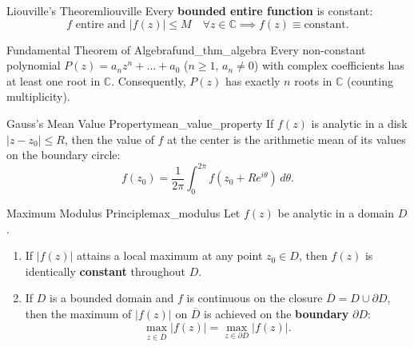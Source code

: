 \begin{theorem}{Liouville's Theorem}{liouville}
Every \textbf{bounded entire function} is constant:
\begin{equation}
f \text{ entire and } |f(z)| \le M \quad \forall z \in \mathbb{C} \implies f(z) \equiv \text{constant}.
\end{equation}
\end{theorem}

\begin{theorem}{Fundamental Theorem of Algebra}{fund_thm_algebra}
Every non-constant polynomial $P(z) = a_n z^n + \dots + a_0$ ($n \ge 1$, $a_n \neq 0$) with complex coefficients has at least one root in $\mathbb{C}$.
Consequently, $P(z)$ has exactly $n$ roots in $\mathbb{C}$ (counting multiplicity).
\end{theorem}

\begin{theorem}{Gauss's Mean Value Property}{mean_value_property}
If $f(z)$ is analytic in a disk $|z - z_0| \le R$, then the value of $f$ at the center is the arithmetic mean of its values on the boundary circle:
\begin{equation}
f(z_0) = \frac{1}{2\pi} \int_0^{2\pi} f(z_0 + R e^{i\theta})\, d\theta.
\end{equation}
\end{theorem}

\begin{theorem}{Maximum Modulus Principle}{max_modulus}
Let $f(z)$ be analytic in a domain $D$.
\begin{enumerate}
    \item If $|f(z)|$ attains a local maximum at any point $z_0 \in D$, then $f(z)$ is identically \textbf{constant} throughout $D$.
    \item If $D$ is a bounded domain and $f$ is continuous on the closure $\overline{D} = D \cup \partial D$, then the maximum of $|f(z)|$ on $\overline{D}$ is achieved on the \textbf{boundary} $\partial D$:
    \begin{equation}
    \max_{z \in \overline{D}} |f(z)| = \max_{z \in \partial D} |f(z)|.
    \end{equation}
\end{enumerate}
\end{theorem}
